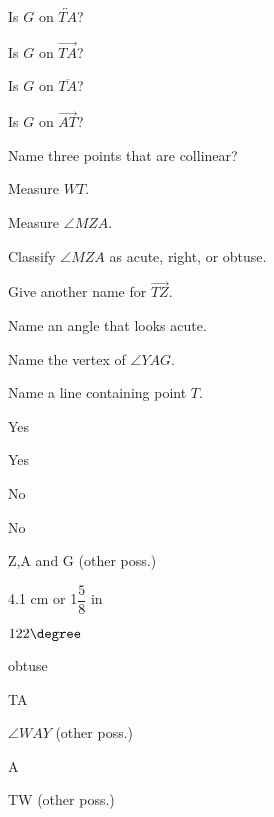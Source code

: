 \begin{exercises}
\begin{ex}
	\begin{multicols}{2}
	\begin{exparts}
		\item Is $G$ on $\overleftrightarrow{TA}$?
	\vfill
		\item Is $G$ on $\overrightarrow{TA}$?
	\vfill
		\item Is $G$ on $\overline{TA}$?
	\vfill
		\item Is $G$ on $\overrightarrow{AT}$?
	\vfill
		\item Name three points that are collinear?
	\vfill
		\item Measure $WT$.
	\columnbreak
		\item Measure $\angle MZA$.
	\vfill
		\item Classify $\angle MZA$ as acute, right, or obtuse.
	\vfill
		\item Give another name for $\overrightarrow{TZ}$.
	\vfill
		\item Name an angle that looks acute.
	\vfill
		\item Name the vertex of $\angle YAG$.
	\vfill
		\item Name a line containing point $T$.
	\vfill
	\end{exparts}
	\end{multicols}
	\begin{sol}
	\begin{exparts}
	\item Yes
	\item Yes
	\item No
	\item No
	\item Z,A and G (other poss.)
	\item 4.1 cm or 1$\dfrac{5}{8}$ in
	\item $122\degree$
	\item obtuse
	\item \ray TA
	\item $\angle WAY$ (other poss.)
	\item A
	\item \lin TW (other poss.)
	\end{exparts}
	\end{sol}
	\end{ex}
	

\end{exercises}
